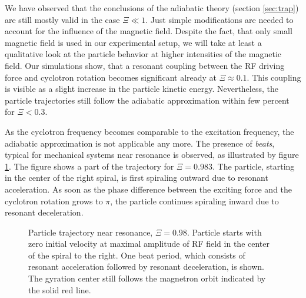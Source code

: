 We have observed that the conclusions of the
adiabatic theory (section \ref{sec:trap}) are still mostly
valid in the case $\Xi \ll 1$.
Just simple modifications are needed to account
for the influence of the magnetic field. Despite the fact, that
only small magnetic field is used in our experimental setup, we
will take at least a qualitative look at the particle behavior
at higher intensities of the magnetic field. Our simulations
show, that a resonant coupling between the \ac{RF} driving
force and cyclotron rotation becomes significant already at
$\Xi\approx0.1$. This coupling is visible as a slight increase
in the particle kinetic energy. Nevertheless, the particle
trajectories still follow the adiabatic approximation within
few percent for $\Xi<0.3$.

As the cyclotron frequency becomes comparable to the excitation
frequency, the adiabatic approximation is not applicable any more.
The presence of {\em beats}, typical for mechanical systems near
resonance is observed, as illustrated by figure \ref{fig:esmpt:beat}.
The figure shows a part of the trajectory for $\Xi = 0.983$.
The particle, starting in the center of the right spiral, is
first spiraling outward due to resonant acceleration. As soon
as the phase difference between the exciting force and the
cyclotron rotation grows to $\pi$, the particle continues
spiraling inward due to resonant deceleration.
\begin{figure}
\caption{Particle trajectory near resonance, $\Xi=0.98$.
Particle starts with zero initial velocity at maximal amplitude of
\ac{RF} field in the center of the spiral to the right.
One beat period, which consists of resonant acceleration followed
by resonant deceleration, is shown.
The gyration center still follows the magnetron orbit indicated by
the solid red line.
}
\label{fig:esmpt:beat}
\end{figure}

